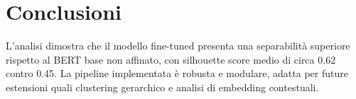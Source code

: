 \documentclass[a4paper,11pt]{article}
\begin{document}
\section{Conclusioni}
L'analisi dimostra che il modello fine-tuned presenta una separabilità superiore rispetto al BERT base non affinato, con silhouette score medio di circa 0.62 contro 0.45. La pipeline implementata è robusta e modulare, adatta per future estensioni quali clustering gerarchico e analisi di embedding contestuali.
\end{document}
